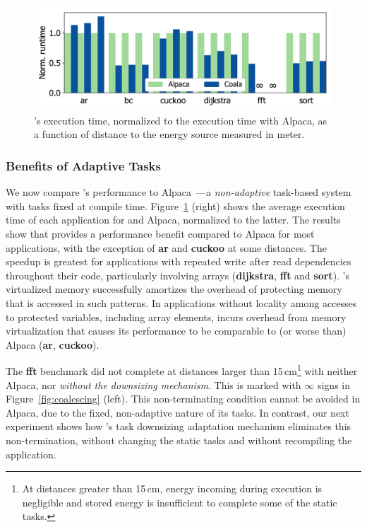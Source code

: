 \begin{figure}
	\includegraphics[width=\columnwidth]{figures/coala_alpaca_gcc}
    \caption{\sys's execution time, normalized to the execution time 
    with Alpaca, as a function of distance to the energy source 
    measured in meter.}
	\label{fig:runtime}
\end{figure}

\subsubsection{Benefits of Adaptive Tasks}

We now compare \sys's performance to Alpaca~\cite{alpaca}---a
\emph{non-adaptive} task-based system with tasks fixed at compile time.
Figure~\ref{fig:runtime} (right) shows the average execution time of each
application for \sys and Alpaca, normalized to the latter. The results show
that \sys provides a performance benefit compared to Alpaca for most
applications, with the exception of \textbf{ar} and \textbf{cuckoo} at some
distances.  The speedup is greatest for applications with repeated write after
read dependencies throughout their code, particularly involving arrays
(\textbf{dijkstra}, \textbf{fft} and \textbf{sort}). \sys's virtualized memory
successfully amortizes the overhead of protecting memory that is accessed in
such patterns.  In applications without locality among accesses to protected
variables, including array elements, \sys incurs overhead from memory
virtualization that causes its performance to be comparable to (or worse than)
Alpaca (\textbf{ar}, \textbf{cuckoo}).

The \textbf{fft} benchmark did not complete at distances larger than
15\,cm\footnote{At distances greater than 15\,cm, energy incoming during
execution is negligible and stored energy is insufficient to complete some of
the static tasks.} with neither Alpaca, nor \sys \emph{without the downsizing
mechanism}. This is marked with $\infty$ signs in Figure~\ref{fig:coalescing}
(left).  This non-terminating condition cannot be avoided in Alpaca, due to the
fixed, non-adaptive nature of its tasks.  In contrast, our next experiment
shows how \sys's task downsizing adaptation mechanism eliminates this
non-termination, without changing the static tasks and without recompiling the
application.


